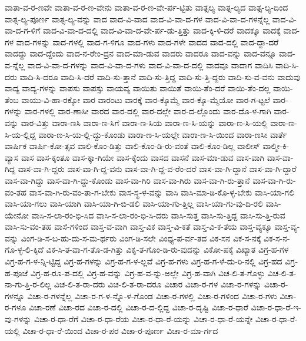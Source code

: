 {ವಾತಾ-ವ-ರ-ಣವೇ
ವಾತಾ-ವ-ರ-ಣ-ವೇನು
ವಾತಾ-ವ-ರ-ಣ-ವೇ-ರ್ಪ-ಟ್ಟಿತು
ವಾತ್ಸಲ್ಯ
ವಾತ್ಸ-ಲ್ಯದ
ವಾತ್ಸ-ಲ್ಯ-ದಿಂದ
ವಾತ್ಸ-ಲ್ಯ-ಪೂರ್ಣ
ವಾತ್ಸ-ಲ್ಯ-ವನ್ನು
ವಾದ
ವಾದ-ವಿ-ವಾದ
ವಾದ-ವಿ-ವಾ-ದ-ಗಳ
ವಾದ-ವಿ-ವಾ-ದ-ಗಳನ್ನೆಲ್ಲ
ವಾದ-ವಿ-ವಾ-ದ-ಗ-ಳಿಗೆ
ವಾದ-ವಿ-ವಾ-ದ-ದಲ್ಲಿ
ವಾದ-ವಿ-ವಾ-ದ-ವೇ-ರ್ಪ-ಡು-ತ್ತಿತ್ತು
ವಾದ-ಕ್ಕಿ-ಳಿ-ದರೆ
ವಾದಕ್ಕೂ
ವಾದಕ್ಕೆ
ವಾದ-ಗಳ
ವಾದ-ಗಳನ್ನು
ವಾದ-ಗಳಲ್ಲಿ
ವಾದ-ಗ-ಳಿಗೂ
ವಾದ-ಗಳು
ವಾದ-ಗಳೇ
ವಾದದ
ವಾದ-ದಲ್ಲಿ
ವಾದ-ದ್ದಾ-ದರೆ
ವಾದದ್ದು
ವಾದ-ದ್ದೆಂದು
ವಾದ-ನ-ರೇಂ-ದ್ರನ
ವಾದ-ಮಾ-ಡುವ
ವಾದರು
ವಾದರೂ
ವಾದ-ವನ್ನು
ವಾದ-ವನ್ನೂ
ವಾದ-ವ-ನ್ನೆಲ್ಲ
ವಾದ-ವಿ-ವಾ-ದ-ಗಳನ್ನು
ವಾದ-ವಿ-ವಾ-ದ-ಗಳು
ವಾದ-ವಿ-ವಾ-ದ-ದಲ್ಲಿ
ವಾದವೂ
ವಾದಾಗ
ವಾದಿಸಿ
ವಾದಿ-ಸಿ-ದರು
ವಾದಿ-ಸಿ-ದರೂ
ವಾದಿ-ಸಿ-ದರೆ
ವಾದಿ-ಸು-ತ್ತಾನೆ
ವಾದಿ-ಸು-ತ್ತಿದ್ದ
ವಾದಿ-ಸು-ತ್ತಿ-ದ್ದರು
ವಾದಿ-ಸು-ವ-ವನು
ವಾದುವು
ವಾದ್ಯ
ವಾದ್ಯ-ಗಳನ್ನು
ವಾಪಸು
ವಾಪಸ್ಸು
ವಾಯವ್ಯ
ವಾಯಿತು
ವಾಯಿತೆ
ವಾಯಿ-ತೆಂ-ದರೆ
ವಾಯಿ-ತೆಂ-ದಲ್ಲ
ವಾಯಿ-ತೆಂಬ
ವಾಯು-ವಿ-ಹಾ-ರಕ್ಕೋ
ವಾರ
ವಾರಂಟು
ವಾರಕ್ಕೆ
ವಾರ-ಕ್ಕೊಮ್ಮೆ
ವಾರ-ಕ್ಕೊ-ಮ್ಮೆಯೋ
ವಾರ-ಗ-ಟ್ಟಲೆ
ವಾರ-ಗಳನ್ನು
ವಾರ-ಗಳಲ್ಲಿ
ವಾರ-ಣಾಸೀ
ವಾರದ
ವಾರ-ದಲ್ಲಿ
ವಾರ-ದಲ್ಲೇ
ವಾರ-ದ-ಲ್ಲೊಂದು
ವಾರ-ದೊ-ಳ-ಗಾಗಿ
ವಾರ-ವನ್ನು
ವಾರ-ವಿತ್ತು
ವಾರಾ-ಣಸಿ
ವಾರಾ-ಣ-ಸಿಗೆ
ವಾರಾ-ಣ-ಸಿಯ
ವಾರಾ-ಣ-ಸಿ-ಯನ್ನು
ವಾರಾ-ಣ-ಸಿ-ಯಲ್ಲಿ
ವಾರಾ-ಣ-ಸಿ-ಯ-ಲ್ಲಿದ್ದ
ವಾರಾ-ಣ-ಸಿ-ಯ-ಲ್ಲಿ-ದ್ದು-ಕೊಂಡು
ವಾರಾ-ಣ-ಸಿ-ಯಲ್ಲೇ
ವಾರಾ-ಣ-ಸಿ-ಯಿಂದ
ವಾರಾ-ಣಸೀ
ವಾರ್ತೆ
ವಾರ್ಷಿಕ
ವಾರ್ಷಿ-ಕೋ-ತ್ಸವ
ವಾಲಿ-ಕೊಂ-ಡಿತ್ತು
ವಾಲಿ-ಕೊಂ-ಡಿ-ರು-ವಂತೆ
ವಾಲಿ-ಕೊಂ-ಡಿಲ್ಲ
ವಾಲೀಸ್
ವಾಲ್ಮೀ-ಕಿ-ವ್ಯಾಸ
ವಾಸ
ವಾಸ-ಕ್ಕಂತೂ
ವಾಸ-ಕ್ಕಾ-ಗಿಯೇ
ವಾಸ-ಕ್ಕೆಂದು
ವಾಸದ
ವಾಸನೆ
ವಾಸ-ಮಾ-ಡುವ
ವಾಸ-ವಾಗಿ
ವಾಸ-ವಾ-ಗಿದ್ದ
ವಾಸ-ವಾ-ಗಿ-ದ್ದರು
ವಾಸ-ವಾ-ಗಿ-ದ್ದ-ವನು
ವಾಸ-ವಾ-ಗಿ-ದ್ದ-ವ-ರೆಂ-ದರೆ
ವಾಸ-ವಾ-ಗಿ-ದ್ದಾನೆ
ವಾಸ-ವಾ-ಗಿ-ದ್ದಾರೆ
ವಾಸ-ವಾ-ಗಿದ್ದು
ವಾಸ-ವಾ-ಗಿ-ದ್ದು-ಕೊಂಡು
ವಾಸ-ವಾ-ಗಿರಿ
ವಾಸ-ವಾ-ಗಿರು
ವಾಸ-ವಾ-ಗಿ-ರು-ತ್ತಾನೆ
ವಾಸ-ವಾ-ಗಿ-ರು-ವಂ-ತಹ
ವಾಸ-ವಾ-ಗಿ-ರು-ವಂ-ತಾ-ಗ-ಬೇಕು
ವಾಸ-ಸ್ಥ-ಳ-ವನ್ನು
ವಾಸಿ
ವಾಸಿ-ಮಾ-ಡಿ-ಕೊ-ಳ್ಳ-ಬೇಕು
ವಾಸಿ-ಯಾ-ಗಲಿ
ವಾಸಿ-ಯಾ-ಗಲು
ವಾಸಿ-ಯಾಗಿ
ವಾಸಿ-ಯಾ-ಗಿ-ಬಿ-ಡಲಿ
ವಾಸಿ-ಯಾ-ಗು-ತ್ತಿಲ್ಲ
ವಾಸಿ-ಯಾ-ಗು-ವು-ದಿ-ರಲಿ
ವಾಸಿ-ಯೇನೋ
ವಾಸಿ-ಸ-ಲಾ-ರಂ-ಭಿ-ಸಿದ
ವಾಸಿ-ಸ-ಲಾ-ರಂ-ಭಿ-ಸಿ-ದರು
ವಾಸಿ-ಸುತ್ತ
ವಾಸಿ-ಸು-ತ್ತಿದ್ದ
ವಾಸಿ-ಸು-ತ್ತಿ-ರುವ
ವಾಸಿ-ಸು-ವಂ-ತಹ
ವಾಸೆ-ಗಳಿಂದ
ವಾಸ್ತ-ವ-ವಾಗಿ
ವಾಸ್ತ-ವಿಕ
ವಾಸ್ತ-ವಿ-ಕತೆ
ವಾಸ್ತ-ವಿ-ಕ-ತೆಯ
ವಾಸ್ತ-ವ್ಯಕ್ಕೂ
ವಾಸ್ತ-ವ್ಯ-ವನ್ನು
ವಿಂಗ-ಡಿ-ಸ-ಬ-ಹು-ದು-ಸ-ಮ-ರ್ಥರು
ವಿಂಗ-ಡಿ-ಸಲೇ
ವಿಂಧ್ಯ-ಪ-ರ್ವ-ತದ
ವಿಕ-ಸನ
ವಿಕ-ಸ-ನಕ್ಕೆ
ವಿಕ-ಸ-ನ-ಗೊ-ಳ್ಳ-ಲಿ-ಕ್ಕಿದೆ
ವಿಕ-ಸಿ-ತ-ವಾ-ಗ-ತೊ-ಡ-ಗಿತ್ತು
ವಿಕೃ-ತ-ಗೊಂ-ಡಿ-ರು-ವುದನ್ನು
ವಿಕೋ-ಪಕ್ಕೆ
ವಿಖ್ಯಾತ
ವಿಗ್ರ-ಹ-ಗಳ
ವಿಗ್ರ-ಹ-ಗ-ಳ-ನ್ನಿ-ಟ್ಟಿದ್ದ
ವಿಗ್ರ-ಹ-ಗಳನ್ನು
ವಿಗ್ರ-ಹ-ಗ-ಳ-ಲ್ಲವೆ
ವಿಗ್ರ-ಹ-ಗಳು
ವಿಗ್ರ-ಹ-ಗ-ಳೆ-ದು-ರಿ-ನಲ್ಲಿ
ವಿಗ್ರ-ಹದ
ವಿಗ್ರ-ಹ-ಪೂಜೆ
ವಿಗ್ರ-ಹ-ರೂ-ಪ-ದಲ್ಲಿ
ವಿಗ್ರ-ಹ-ವನ್ನು
ವಿಗ್ರ-ಹ-ವ-ನ್ನು-ಅಲ್ಲೇ
ವಿಗ್ರ-ಹ-ವಾಗಿ
ವಿಚ-ಲಿ-ತ-ಗೊಳ್ಳು
ವಿಚ-ಲಿ-ತ-ನಾ-ಗು-ತ್ತಿ-ರ-ಲಿಲ್ಲ
ವಿಚ-ಲಿ-ತ-ರಾ-ದರು
ವಿಚ-ಲಿ-ತ-ರಾ-ದರೂ
ವಿಚಾರ
ವಿಚಾ-ರ-ಗಳ
ವಿಚಾ-ರ-ಗಳನ್ನು
ವಿಚಾ-ರ-ಗಳನ್ನೂ
ವಿಚಾ-ರ-ಗಳನ್ನೆಲ್ಲ
ವಿಚಾ-ರ-ಗ-ಳ-ನ್ನೊ-ಳ-ಗೊಂಡ
ವಿಚಾ-ರ-ಗಳಲ್ಲಿ
ವಿಚಾ-ರ-ಗಳಿಂದ
ವಿಚಾ-ರ-ಗಳು
ವಿಚಾ-ರ-ಗಳೂ
ವಿಚಾ-ರಣೆ
ವಿಚಾ-ರದ
ವಿಚಾ-ರ-ದಲ್ಲಿ
ವಿಚಾ-ರ-ದ-ಲ್ಲಿದ್ದ
ವಿಚಾ-ರ-ದೃಷ್ಟಿ
ವಿಚಾ-ರ-ಧಾರೆ
ವಿಚಾ-ರ-ಧಾ-ರೆ-ಇ-ವು-ಗಳನ್ನು
ವಿಚಾ-ರ-ಧಾ-ರೆಗೆ
ವಿಚಾ-ರ-ಧಾ-ರೆಯ
ವಿಚಾ-ರ-ಧಾ-ರೆ-ಯನ್ನು
ವಿಚಾ-ರ-ಧಾ-ರೆ-ಯನ್ನೇ
ವಿಚಾ-ರ-ಧಾ-ರೆ-ಯಲ್ಲಿ
ವಿಚಾ-ರ-ಧಾ-ರೆ-ಯಿಂದ
ವಿಚಾ-ರ-ಪರ
ವಿಚಾ-ರ-ಪೂರ್ಣ
ವಿಚಾ-ರ-ಮಾ-ರ್ಗದ
}
